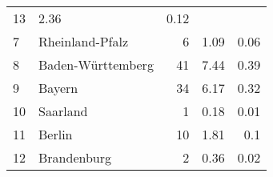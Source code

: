 \begin{longtable}{lXrrr}
       \num{13} &
       \num[round-mode=places,round-precision=2]{2,36} &
         \num[round-mode=places,round-precision=2]{0,12} \\

     7 &
     \multicolumn{1}{X}{ Rheinland-Pfalz   } &


       \num{6} &
       \num[round-mode=places,round-precision=2]{1,09} &
         \num[round-mode=places,round-precision=2]{0,06} \\

     8 &
     \multicolumn{1}{X}{ Baden-Württemberg   } &


       \num{41} &
       \num[round-mode=places,round-precision=2]{7,44} &
         \num[round-mode=places,round-precision=2]{0,39} \\

     9 &
     \multicolumn{1}{X}{ Bayern   } &


       \num{34} &
       \num[round-mode=places,round-precision=2]{6,17} &
         \num[round-mode=places,round-precision=2]{0,32} \\

     10 &
     \multicolumn{1}{X}{ Saarland   } &


       \num{1} &
       \num[round-mode=places,round-precision=2]{0,18} &
         \num[round-mode=places,round-precision=2]{0,01} \\

     11 &
     \multicolumn{1}{X}{ Berlin   } &


       \num{10} &
       \num[round-mode=places,round-precision=2]{1,81} &
         \num[round-mode=places,round-precision=2]{0,1} \\

     12 &
     \multicolumn{1}{X}{ Brandenburg   } &


       \num{2} &
       \num[round-mode=places,round-precision=2]{0,36} &
         \num[round-mode=places,round-precision=2]{0,02} \\


\end{longtable}
